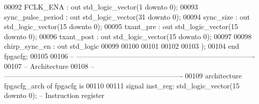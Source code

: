 \begin{DoxyCode}
00092         \textcolor{vhdlchar}{FCLK_ENA}                \textcolor{vhdlchar}{:} \textcolor{keywordflow}{out} \textcolor{comment}{std\_logic\_vector}\textcolor{vhdlchar}{(}\textcolor{vhdllogic}{}\textcolor{vhdllogic}{1} \textcolor{keywordflow}{downto} \textcolor{vhdllogic}{}\textcolor{vhdllogic}{0}\textcolor{vhdlchar}{)};
00093         \textcolor{vhdlchar}{sync_pulse_period} \textcolor{vhdlchar}{:} \textcolor{keywordflow}{out} \textcolor{comment}{std\_logic\_vector}\textcolor{vhdlchar}{(}\textcolor{vhdllogic}{}\textcolor{vhdllogic}{31} \textcolor{keywordflow}{downto} \textcolor{vhdllogic}{}\textcolor{vhdllogic}{0}\textcolor{vhdlchar}{)};
00094         \textcolor{vhdlchar}{sync_size}           \textcolor{vhdlchar}{:} \textcolor{keywordflow}{out} \textcolor{comment}{std\_logic\_vector}\textcolor{vhdlchar}{(}\textcolor{vhdllogic}{}\textcolor{vhdllogic}{15} \textcolor{keywordflow}{downto} \textcolor{vhdllogic}{}\textcolor{vhdllogic}{0}\textcolor{vhdlchar}{)};
00095         \textcolor{vhdlchar}{txant_pre}           \textcolor{vhdlchar}{:} \textcolor{keywordflow}{out} \textcolor{comment}{std\_logic\_vector}\textcolor{vhdlchar}{(}\textcolor{vhdllogic}{}\textcolor{vhdllogic}{15} \textcolor{keywordflow}{downto} \textcolor{vhdllogic}{}\textcolor{vhdllogic}{0}\textcolor{vhdlchar}{)};
00096         \textcolor{vhdlchar}{txant_post}          \textcolor{vhdlchar}{:} \textcolor{keywordflow}{out} \textcolor{comment}{std\_logic\_vector}\textcolor{vhdlchar}{(}\textcolor{vhdllogic}{}\textcolor{vhdllogic}{15} \textcolor{keywordflow}{downto} \textcolor{vhdllogic}{}\textcolor{vhdllogic}{0}\textcolor{vhdlchar}{)};
00097         
00098         \textcolor{vhdlchar}{chirp_sync_en}       \textcolor{vhdlchar}{:} \textcolor{keywordflow}{out} \textcolor{comment}{std\_logic}
00099         
00100         
00101 
00102 
00103     \textcolor{vhdlchar}{)};
00104 \textcolor{keywordflow}{end} \textcolor{vhdlchar}{fpgacfg};
00105 
00106 \textcolor{keyword}{-- ----------------------------------------------------------------------------}
00107 \textcolor{keyword}{-- Architecture}
00108 \textcolor{keyword}{-- ----------------------------------------------------------------------------}
00109 \textcolor{keywordflow}{architecture} fpgacfg\_arch \textcolor{keywordflow}{of} fpgacfg is
00110 
00111     \textcolor{keywordflow}{signal} \textcolor{vhdlchar}{inst_reg}\textcolor{vhdlchar}{:} \textcolor{comment}{std\_logic\_vector}\textcolor{vhdlchar}{(}\textcolor{vhdllogic}{}\textcolor{vhdllogic}{15} \textcolor{keywordflow}{downto} \textcolor{vhdllogic}{}\textcolor{vhdllogic}{0}\textcolor{vhdlchar}{)};\textcolor{keyword}{     -- Instruction register}

\end{DoxyCode}
